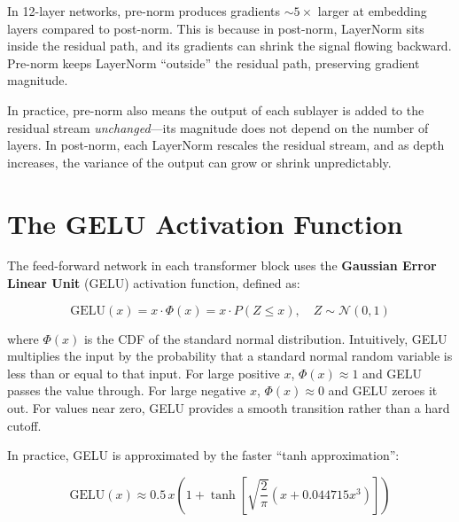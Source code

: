 \begin{keyconcept}
  In 12-layer networks, pre-norm produces gradients $\sim5\times$ larger
  at embedding layers compared to post-norm. This is because in
  post-norm, LayerNorm sits inside the residual path, and its gradients
  can shrink the signal flowing backward. Pre-norm keeps LayerNorm
  ``outside'' the residual path, preserving gradient magnitude.

  In practice, pre-norm also means the output of each sublayer is added to
  the residual stream \emph{unchanged}---its magnitude does not depend on the
  number of layers. In post-norm, each LayerNorm rescales the residual stream,
  and as depth increases, the variance of the output can grow or shrink
  unpredictably.
\end{keyconcept}

\section{The GELU Activation Function}

The feed-forward network in each transformer block uses the \textbf{Gaussian
Error Linear Unit} (GELU) activation function, defined as:

\[
  \text{GELU}(x) = x \cdot \Phi(x) = x \cdot P(Z \leq x), \quad Z \sim \mathcal{N}(0, 1)
\]

where $\Phi(x)$ is the CDF of the standard normal distribution. Intuitively,
GELU multiplies the input by the probability that a standard normal random
variable is less than or equal to that input. For large positive $x$, $\Phi(x)
\approx 1$ and GELU passes the value through. For large negative $x$,
$\Phi(x) \approx 0$ and GELU zeroes it out. For values near zero, GELU
provides a smooth transition rather than a hard cutoff.

In practice, GELU is approximated by the faster ``tanh approximation'':

\[
  \text{GELU}(x) \approx 0.5\,x\left(1 + \tanh\!\left[\sqrt{\frac{2}{\pi}}\left(x + 0.044715x^3\right)\right]\right)
\]

